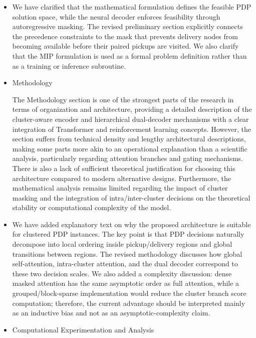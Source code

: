 \documentclass{article}
\begin{document}
\begin{itemize}
\item[\textbf{Response:}] We have clarified that the mathematical formulation defines the feasible PDP solution space, while the neural decoder enforces feasibility through autoregressive masking. The revised preliminary section explicitly connects the precedence constraints to the mask that prevents delivery nodes from becoming available before their paired pickups are visited. We also clarify that the MIP formulation is used as a formal problem definition rather than as a training or inference subroutine.


\item[\textbf{Comment. 5}] {Methodology


The Methodology section is one of the strongest parts of the research in terms of organization and architecture, providing a detailed description of the cluster-aware encoder and hierarchical dual-decoder mechanisms with a clear integration of Transformer and reinforcement learning concepts. However, the section suffers from technical density and lengthy architectural descriptions, making some parts more akin to an operational explanation than a scientific analysis, particularly regarding attention branches and gating mechanisms. There is also a lack of sufficient theoretical justification for choosing this architecture compared to modern alternative designs. Furthermore, the mathematical analysis remains limited regarding the impact of cluster masking and the integration of intra/inter-cluster decisions on the theoretical stability or computational complexity of the model.}


\item[\textbf{Response:}] We have added explanatory text on why the proposed architecture is suitable for clustered PDP instances. The key point is that PDP decisions naturally decompose into local ordering inside pickup/delivery regions and global transitions between regions. The revised methodology discusses how global self-attention, intra-cluster attention, and the dual decoder correspond to these two decision scales. We also added a complexity discussion: dense masked attention has the same asymptotic order as full attention, while a grouped/block-sparse implementation would reduce the cluster branch score computation; therefore, the current advantage should be interpreted mainly as an inductive bias and not as an asymptotic-complexity claim.


\item[\textbf{Comment. 6}] {Computational Experimentation and Analysis


}
\end{itemize}
\end{document}
